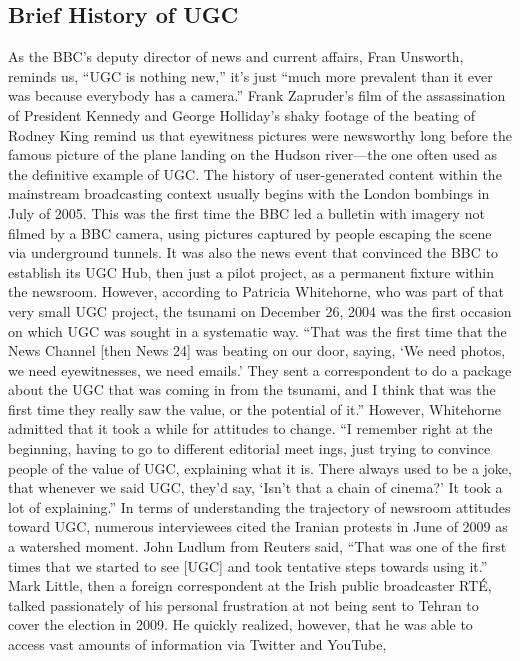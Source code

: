 \begin{enumerate}
\chapter{Brief History of UGC}
As the BBC's deputy director of news and current affairs, Fran Unsworth,
reminds us, ``UGC is nothing new,'' it's just ``much more prevalent than it
ever was because everybody has a camera.'' Frank Zapruder's film of the
assassination of President Kennedy and George Holliday's shaky footage of
the beating of Rodney King remind us that eyewitness pictures were newsworthy
long before the famous picture of the plane landing on the Hudson
river—the one often used as the definitive example of UGC.
The history of user-generated content within the mainstream broadcasting
context usually begins with the London bombings in July of 2005. This was
the first time the BBC led a bulletin with imagery not filmed by a BBC camera,
using pictures captured by people escaping the scene via underground
tunnels. It was also the news event that convinced the BBC to establish
its UGC Hub, then just a pilot project, as a permanent fixture within
the newsroom.
However, according to Patricia Whitehorne, who was part of that very small
UGC project, the tsunami on December 26, 2004 was the first occasion on
which UGC was sought in a systematic way. ``That was the first time that the
News Channel [then News 24] was beating on our door, saying, ‘We need
photos, we need eyewitnesses, we need emails.' They sent a correspondent
to do a package about the UGC that was coming in from the tsunami, and I
think that was the first time they really saw the value, or the potential of it.''
However, Whitehorne admitted that it took a while for attitudes to change.
``I remember right at the beginning, having to go to different editorial meet
ings, just trying to convince people of the value of UGC, explaining what it
is. There always used to be a joke, that whenever we said UGC, they'd say,
‘Isn't that a chain of cinema?' It took a lot of explaining.''
In terms of understanding the trajectory of newsroom attitudes toward
UGC, numerous interviewees cited the Iranian protests in June of 2009 as
a watershed moment. John Ludlum from Reuters said, ``That was one of the
first times that we started to see [UGC] and took tentative steps towards
using it.'' Mark Little, then a foreign correspondent at the Irish public broadcaster
RTÉ, talked passionately of his personal frustration at not being sent
to Tehran to cover the election in 2009. He quickly realized, however, that
he was able to access vast amounts of information via Twitter and YouTube,

\end{enumerate}
